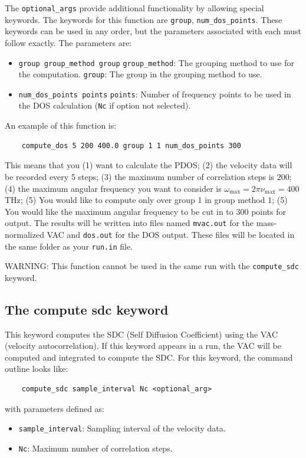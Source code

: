 \documentclass[12pt,a4paper]{report}
\begin{document}
The \verb"optional_args" provide additional functionality by allowing special keywords. The keywords for this function are \verb"group", \verb"num_dos_points". These keywords can be used in any order, but the parameters associated with each must follow exactly. The parameters are:
\begin{itemize}
    \item \verb"group group_method group"
    \subitem \verb"group_method": The grouping method to use for the computation.
    \subitem \verb"group": The group in the grouping method to use.
    \item \verb"num_dos_points points"
    \subitem \verb"points": Number of frequency points to be used in the DOS calculation (\verb"Nc" if option not selected).
\end{itemize}

An example of this function is:
\begin{verbatim}
    compute_dos 5 200 400.0 group 1 1 num_dos_points 300
\end{verbatim}

This means that you (1) want to calculate the PDOS; (2) the velocity data will be recorded every 5 steps; (3) the maximum number of correlation steps is $200$; (4) the maximum angular frequency you want to consider is $\omega_{\text{max}}=2\pi \nu_{\text{max}}= 400$ THz; (5) You would like to compute only over group 1 in group method 1; (5) You would like the maximum angular frequency to be cut in to 300 points for output. The results will be written into files named \verb"mvac.out" for the mass-normalized VAC and \verb"dos.out" for the DOS output. These files will be located in the same folder as your \verb"run.in" file.

WARNING: This function cannot be used in the same run with the \verb"compute_sdc" keyword.

\subsection{The compute sdc keyword}
This keyword computes the SDC (Self Diffusion Coefficient) using the VAC (velocity autocorrelation). If this keyword appears in a run, the VAC will be computed and integrated to compute the SDC. For this keyword, the command outline looks like:
\begin{verbatim}
    compute_sdc sample_interval Nc <optional_arg>
\end{verbatim}

\raggedright with parameters defined as:
\begin{itemize}
  \item \verb"sample_interval": Sampling interval of the velocity data.
  \item \verb"Nc": Maximum number of correlation steps.
\end{itemize}
\end{document}
